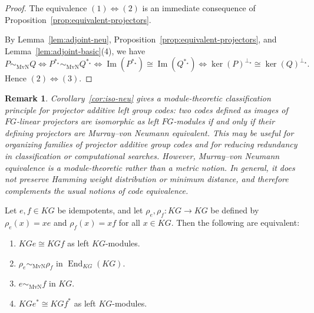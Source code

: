 \documentclass[11pt]{article}
\newtheorem{remark}[theorem]{Remark}
\begin{document}
\begin{proof}
The equivalence $(1)\Leftrightarrow(2)$ is an immediate consequence of Proposition~\ref{prop:equivalent-projectors}.

By Lemma~\ref{lem:adjoint-neu}, Proposition~\ref{prop:equivalent-projectors}, and Lemma~\ref{lem:adjoint-basic}(4), we have
$$
P\sim_{\mathrm{MvN}}Q
\iff
P^{\ast_\star}\sim_{\mathrm{MvN}}Q^{\ast_\star}
\iff
\operatorname{Im}(P^{\ast_\star})\cong \operatorname{Im}(Q^{\ast_\star})
\iff
\ker(P)^{\perp_\star}\cong \ker(Q)^{\perp_\star}.
$$
Hence $(2)\Leftrightarrow(3)$.
\end{proof}
\begin{remark}\label{rem:mvN-coding-significance}
Corollary~\ref{cor:iso-neu} gives a module-theoretic classification principle
for projector additive left group codes: two codes defined as images of
$FG$-linear projectors are isomorphic as left $FG$-modules if and only if
their defining projectors are Murray--von Neumann equivalent. This may be useful for organizing families of projector additive group codes
and for reducing redundancy in classification or computational searches.
However, Murray--von Neumann equivalence is a module-theoretic rather than a
metric notion. In general, it does not preserve Hamming weight distribution
or minimum distance, and therefore complements the usual notions of code
equivalence.
\end{remark}


\begin{corollary}\label{cor:idempotent-neu}
Let $e,f\in KG$ be idempotents, and let $\rho_e,\rho_f:KG\longrightarrow KG$ be defined by $\rho_e(x)=xe$ and $\rho_f(x)=xf$ for all $x\in KG$. Then the following are equivalent:
\begin{enumerate}
    \item $KGe\cong KGf$ as left $KG$-modules.
    \item $\rho_e\sim_{\mathrm{MvN}}\rho_f$ in $\operatorname{End}_{KG}(KG)$.
    \item $e\sim_{\mathrm{MvN}}f$ in $KG$.
    \item $KGe^\ast\cong KGf^\ast$ as left $KG$-modules.
\end{enumerate}
\end{corollary}
\end{document}
